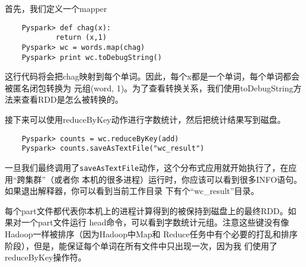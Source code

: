 首先，我们定义一个mapper

\begin{lstlisting}
	Pyspark> def chag(x):
			return (x,1)
	Pyspark> wc = words.map(chag)
	Pyspark> print wc.toDebugString()
\end{lstlisting}

这行代码将会把chag映射到每个单词。因此，每个x都是一个单词，每个单词都会被匿名闭包转换为
元组(word,
1)。为了查看转换关系，我们使用toDebugString方法来查看RDD是怎么被转换的。

接下来可以使用reduceByKey动作进行字数统计，然后把统计结果写到磁盘。

\begin{lstlisting}
	Pyspark> counts = wc.reduceByKey(add)
	Pyspark> counts.saveAsTextFile("wc_result")
\end{lstlisting}

一旦我们最终调用了\texttt{saveAsTextFile}动作，这个分布式应用就开始执行了，在应用“跨集群”（或者你
本机的很多进程）运行时，你应该可以看到很多INFO语句。如果退出解释器，你可以看到当前工作目录
下有个“wc\_result”目录。

每个part文件都代表你本机上的进程计算得到的被保持到磁盘上的最终RDD。如果对一个part文件运行
head命令，可以看到字数统计元组。注意这些键没有像Hadoop一样被排序（因为Hadoop中Map和
Reduce任务中有个必要的打乱和排序阶段），但是，能保证每个单词在所有文件中只出现一次，因为我
们使用了reduceByKey操作符。
